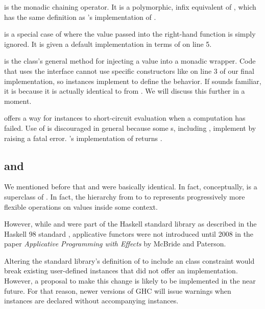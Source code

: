\begin{notelist}
    \item \code{(>>=)} is the monadic chaining operator. It is a polymorphic, infix equivalent of , which has the 
          same definition as 's implementation of \code{(>>=)}.
    \item \code{(>>)} is a special case of \code{(>>=)} where the value passed into the right-hand function is simply ignored.
          It is given a default implementation in terms of \code{(>>=)} on line 5.
    \item {} is the  class's general method for injecting a value into a monadic wrapper. Code that uses
          the  interface cannot use specific constructors like  on line 3 of our final 
          implementation, so  instances implement  to define the behavior. If  sounds familiar,
          it is because it is actually identical to  from . We will discuss this further in a moment.
    \item {} offers a way for  instances to short-circuit evaluation when a computation has failed. Use of 
           is discouraged in general because some s, including , implement  by raising a fatal error.
          's implementation of  returns .
\end{notelist}

\subsection{ and }

We mentioned before that  and  were basically identical. In fact, conceptually,
 is a superclass of . In fact, the hierarchy from  to 
to  represents progressively more flexible operations on values inside some context.

However, while  and  were part of the Haskell standard library as described in the Haskell 98 standard \cite{haskell98},
applicative functors were not introduced until 2008 in the paper \emph{Applicative Programming with Effects} \cite{applicative} by McBride and
Paterson.

Altering the standard library's definition of  to include an  class constraint would break existing user-defined
 instances that did not offer an  implementation. However, a proposal to make this change is likely to be implemented
in the near future. For that reason, newer versions of GHC will issue warnings when  instances are declared without accompanying
 instances. 


